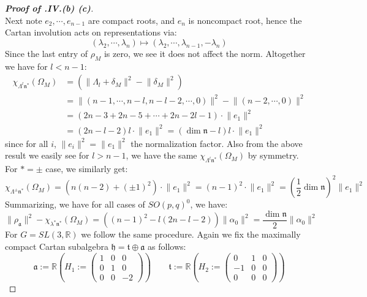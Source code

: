 \documentclass[11pt]{report}
\theoremstyle{definition}
\theoremstyle{plain}
\newcommand{\real}{\mathbb{R}}
\newcommand{\norm}[1]{\lVert #1 \rVert}
\newcommand{\Lie}[1]{\mathfrak{#1}}
\begin{document}
\begin{proof}[\textbf{Proof of .IV.(b) (c)}]
\begin{equation}
\end{equation}
Next note $e_2, \cdots, e_{n-1}$ are compact roots, and $e_n$ is noncompact root, hence the Cartan involution acts on representations via:
\begin{equation}
(\lambda_2, \cdots, \lambda_{n})\mapsto (\lambda_2, \cdots, \lambda_{n-1}, -\lambda_n)
\end{equation}
Since the last entry of $\rho_M$ is zero, we see it does not affect the norm. Altogether we have for $l< n-1$:
\begin{equation}\label{infi char of lambda_l}
\begin{split}
\chi_{\Lambda^l\Lie{n}^*}(\Omega_M)&=(\norm{\Lambda_l+\delta_M}^2-\norm{\delta_M}^2)\\
&=\norm{(n-1, \cdots, n-l, n-l-2, \cdots, 0)}^2-\norm{(n-2, \cdots, 0)}^2\\
&=(2n-3+2n-5+\cdots +2n-2l-1)\cdot \norm{e_1}^2\\
&=(2n-l-2)l\cdot \norm{e_1}^2=(\dim\Lie{n}-l)l\cdot \norm{e_1}^2
\end{split}
\end{equation}
since for all $i$, $\norm{e_i}^2=\norm{e_1}^2$ the normalization factor. Also from the above result we easily see for $l>n-1$, we have the same $\chi_{\Lambda^l\Lie{n}^*}(\Omega_M)$ by symmetry. For $*=\pm$ case, we similarly get:
\begin{equation}
\chi_{\Lambda^\pm\Lie{n}^*}(\Omega_M)=(n(n-2)+(\pm 1)^2)\cdot \norm{e_1}^2=(n-1)^2\cdot \norm{e_1}^2=(\frac{1}{2}\dim\Lie{n})^2\norm{e_1}^2
\end{equation}
Summarizing, we have for all cases of $SO(p,q)^0$, we have:
\begin{equation}
\norm{\rho_{\Lie{a}}}^2-\chi_{\lambda^*\Lie{n}^*}(\Omega_M)=((n-1)^2-l(2n-l-2))\norm{\alpha_0}^2=\frac{\dim\Lie{n}}{2}\norm{\alpha_0}^2
\end{equation}
For $G=SL(3,\real)$ we follow the same procedure. Again we fix the maximally compact Cartan subalgebra $\Lie{h}=\Lie{t}\oplus \Lie{a}$ as follows:
\begin{equation}
\Lie{a}:=\real (H_1:=\begin{pmatrix}
1 &0 &0\\ 0 &1 &0\\ 0 &0 &-2
\end{pmatrix}) \qquad \Lie{t}:=\real(H_2:=\begin{pmatrix}
0 &1&0\\ -1&0 &0\\0 &0 &0
\end{pmatrix} )

\end{equation}
\end{proof}
\end{document}
